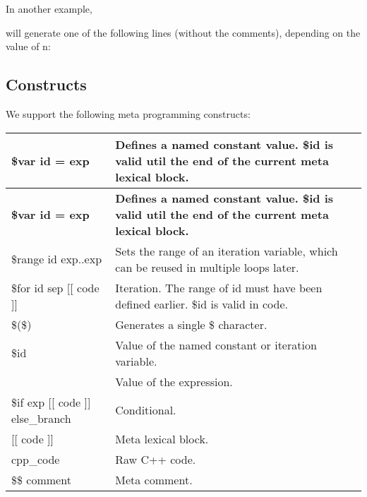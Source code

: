 In another example,


\begin{DoxyCode}{0}
\DoxyCodeLine{\$\$ The text between i and [[ is the separator between iterations.}
\end{DoxyCode}


will generate one of the following lines (without the comments), depending on the value of {\ttfamily n}\+:


\begin{DoxyCode}{0}
\end{DoxyCode}


\subsection*{Constructs}

We support the following meta programming constructs\+:

\tabulinesep=1mm
\begin{longtabu}spread 0pt [c]{*{2}{|X[-1]}|}
\hline
\cellcolor{\tableheadbgcolor}\textbf{ {\ttfamily \$var id = exp}  }&\cellcolor{\tableheadbgcolor}\textbf{ Defines a named constant value. {\ttfamily \$id} is valid util the end of the current meta lexical block.   }\\
\endfirsthead
\hline
\endfoot
\hline
\cellcolor{\tableheadbgcolor}\textbf{ {\ttfamily \$var id = exp}  }&\cellcolor{\tableheadbgcolor}\textbf{ Defines a named constant value. {\ttfamily \$id} is valid util the end of the current meta lexical block.   }\\
\endhead
{\ttfamily \$range id exp..exp}  &Sets the range of an iteration variable, which can be reused in multiple loops later.   \\
{\ttfamily \$for id sep \mbox{[}\mbox{[} code \mbox{]}\mbox{]}}  &Iteration. The range of {\ttfamily id} must have been defined earlier. {\ttfamily \$id} is valid in {\ttfamily code}.   \\
{\ttfamily \$(\$)}  &Generates a single {\ttfamily \$} character.   \\
{\ttfamily \$id}  &Value of the named constant or iteration variable.   \\
{\ttfamily }  &Value of the expression.   \\
{\ttfamily \$if exp \mbox{[}\mbox{[} code \mbox{]}\mbox{]} else\+\_\+branch}  &Conditional.   \\
{\ttfamily \mbox{[}\mbox{[} code \mbox{]}\mbox{]}}  &Meta lexical block.   \\
{\ttfamily cpp\+\_\+code}  &Raw C++ code.   \\
{\ttfamily \$\$ comment}  &Meta comment.   \\
\end{longtabu}


